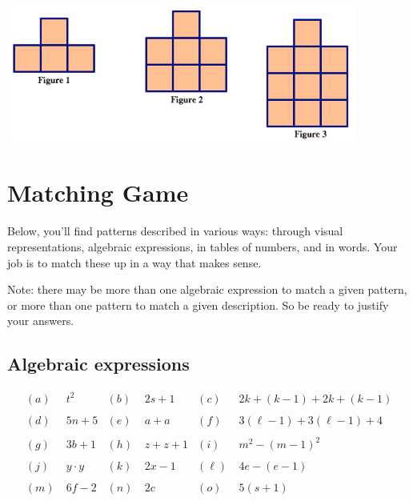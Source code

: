 \begin{problem}\ 

\begin{center}
\includegraphics[height=4.5cm]{pattern6}
\end{center}

\end{problem}



\newpage





\section{Matching Game}\label{sec: matching}
Below, you'll find patterns described in various ways: through visual representations, algebraic expressions, in tables of numbers, and in words.  Your job is to match these up in a way that makes sense.    

 Note: there may be more than one algebraic expression to match a given pattern, or more than one pattern to match a given description.  So be ready to justify your answers.

\subsection*{Algebraic expressions}

\begin{align*}
(a) & \  t^2 
&
(b) & \  2s + 1 
&
(c) & \  2k + (k-1) + 2k + (k-1)
\\
\\
(d) & \  5n + 5
& 
(e) & \ a + a
& 
(f) & \ 3(\ell - 1) + 3 (\ell - 1) + 4
\\
\\
(g) & \  3b + 1
& 
(h) & \ z+ z+ 1
& 
(i) & \ m^2 - (m-1)^2
\\
\\
(j) & \  y\cdot y
& 
(k) & \  2x - 1
& 
(\ell) & \ 4e - (e-1)
\\
\\
(m) & \  6f - 2
& 
(n) & \  2c
& 
(o) & \ 5(s+1)
\end{align*}


